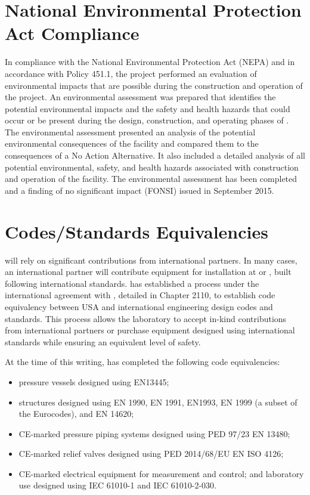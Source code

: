 \section{National Environmental Protection Act Compliance}

In compliance with the National Environmental Protection Act (NEPA) and in
accordance with  Policy 451.1, the
 project performed an evaluation of %
environmental impacts that are possible during the construction and operation of the
project.  An environmental assessment  was prepared %
that identifies the
potential environmental impacts and the safety and health hazards
that could occur or be present during the design, construction, and operating phases of
.  The environmental assessment presented an
analysis of the potential environmental consequences of the facility
and compared them to the consequences of a No Action Alternative. %
It also included a detailed analysis of all potential environmental,
safety, and health hazards associated with construction and operation
of the facility.  The environmental assessment has been completed and
a finding of no significant impact (FONSI) issued in September 2015.

\section{Codes/Standards Equivalencies}
\label{sec:esh_codes}

 will rely on significant contributions from international
partners. In many cases, an international partner will contribute
equipment for installation at  or , built
following international standards.  has established a
process under the international agreement with , detailed
in  Chapter 2110,  to establish code equivalency between
USA and international engineering design codes and standards. This
process allows the laboratory to accept in-kind contributions from
international partners or purchase equipment designed using
international standards while ensuring an equivalent level
of safety.

At the time of this writing,  has completed the following code
equivalencies:
\begin{itemize}
 \item pressure vessels designed using EN13445;
 \item structures designed using EN 1990, EN 1991, EN1993, EN 1999 (a
   subset of the Eurocodes), and EN 14620;
 \item CE-marked pressure piping systems designed using PED 97/23 EN 13480;
 \item CE-marked relief valves designed using PED 2014/68/EU EN ISO 4126;
 \item CE-marked electrical equipment for measurement and control; and
   laboratory use designed using IEC 61010-1 and IEC 61010-2-030.
\end{itemize}

